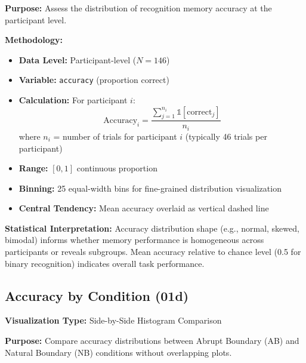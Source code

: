 \documentclass[12pt,a4paper]{article}
\begin{document}
\textbf{Purpose:} Assess the distribution of recognition memory accuracy at the participant level.

\textbf{Methodology:}
\begin{itemize}
    \item \textbf{Data Level:} Participant-level ($N=146$)
    \item \textbf{Variable:} \texttt{accuracy} (proportion correct)
    \item \textbf{Calculation:} For participant $i$:
        \begin{equation}
            \text{Accuracy}_i = \frac{\sum_{j=1}^{n_i} \mathbb{1}[\text{correct}_j]}{n_i}
        \end{equation}
        where $n_i$ = number of trials for participant $i$ (typically 46 trials per participant)
    \item \textbf{Range:} $[0, 1]$ continuous proportion
    \item \textbf{Binning:} 25 equal-width bins for fine-grained distribution visualization
    \item \textbf{Central Tendency:} Mean accuracy overlaid as vertical dashed line
\end{itemize}

\textbf{Statistical Interpretation:} Accuracy distribution shape (e.g., normal, skewed, bimodal) informs whether memory performance is homogeneous across participants or reveals subgroups. Mean accuracy relative to chance level (0.5 for binary recognition) indicates overall task performance.

\subsection{Accuracy by Condition (01d)}

\textbf{Visualization Type:} Side-by-Side Histogram Comparison

\textbf{Purpose:} Compare accuracy distributions between Abrupt Boundary (AB) and Natural Boundary (NB) conditions without overlapping plots.
\end{document}
